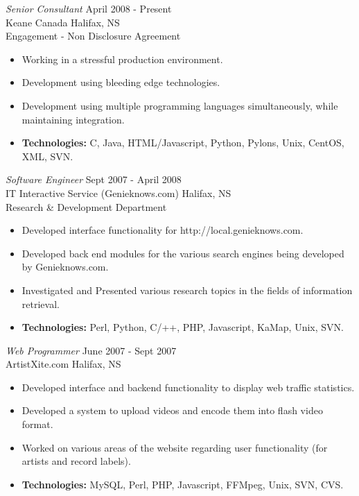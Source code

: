 \documentclass[line,margin]{res}
\begin{document}
\begin{resume}
   {\sl Senior Consultant} \hfill April 2008 - Present \\
    Keane Canada \hfill Halifax, NS \\
    Engagement - Non Disclosure Agreement \smallskip
    \begin{itemize}  \itemsep -2pt %
     \item Working in a stressful production environment.
     \item Development using bleeding edge technologies.
     \item Development using multiple programming languages
            simultaneously, while maintaining integration.
     \item {\bf Technologies:} \hspace{1pt} 
        C, Java, HTML/Javascript, Python, Pylons, Unix, CentOS, \newline 
        \hspace*{72pt} XML, SVN.
    \end{itemize}

   {\sl Software Engineer} \hfill Sept 2007 - April 2008 \\
    IT Interactive Service (Genieknows.com) \hfill Halifax, NS \\
    Research {\&} Development Department \smallskip
    \begin{itemize}  \itemsep -2pt %
     \item Developed interface functionality for
             http://local.genieknows.com.
     \item Developed back end modules for the various search
             engines being developed by Genieknows.com.
     \item Investigated and Presented various research topics
             in the fields of information retrieval.
     \item {\bf Technologies:} \hspace{1pt} 
        Perl, Python, C/++, PHP, Javascript, KaMap, Unix, SVN.
    \end{itemize}

   {\sl Web Programmer} \hfill June 2007 - Sept 2007 \\
    ArtistXite.com \hfill Halifax, NS \smallskip
    \begin{itemize}  \itemsep -2pt %
     \item Developed interface and backend functionality to display 
               web traffic statistics.
     \item Developed a system to upload videos and encode them
                into flash video format.
     \item Worked on various areas of the website regarding user 
               functionality (for artists and record labels).
     \item {\bf Technologies:}\hspace{4pt} 
        MySQL, Perl, PHP, Javascript, FFMpeg, Unix, SVN, CVS.
    \end{itemize}


\end{resume}
\end{document}
